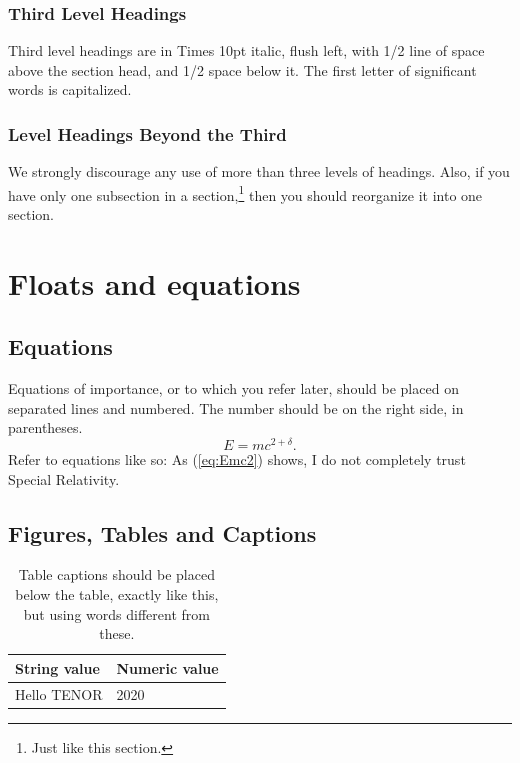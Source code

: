 \documentclass{article}
\begin{document}
\subsubsection{Third Level Headings}
Third level headings are in Times 10pt italic, flush left,
with 1/2 line of space above the section head, and 1/2 space below it.
The first letter of significant words is capitalized.

\subsubsection{Level Headings Beyond the Third}
We strongly discourage any use of
more than three levels of headings.
Also, if you have only one subsection in a section,\footnote{Just like this section.}
then you should reorganize it into one section.

\section{Floats and equations}

\subsection{Equations}
Equations of importance, 
or to which you refer later,
should be placed on separated lines and numbered.
The number should be on the right side, in parentheses.
\begin{equation}
E=mc^{2+\delta}.
\label{eq:Emc2}
\end{equation}
Refer to equations like so:
As (\ref{eq:Emc2}) shows, 
I do not completely trust Special Relativity.

\subsection{Figures, Tables and Captions}
\begin{table}[t]
 \begin{center}
 \begin{tabular}{|l|l|}
  \hline
  String value & Numeric value \\
  \hline
  Hello TENOR  & 2020 \\
  \hline
 \end{tabular}
\end{center}
 \caption{Table captions should be placed below the table, exactly like this,
 but using words different from these.}
 \label{tab:example}
\end{table}
\end{document}

